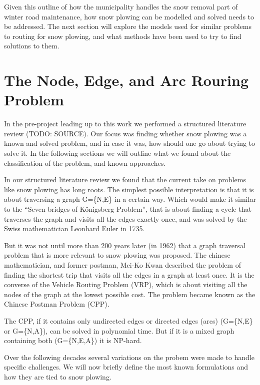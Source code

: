 
Given this outline of how the municipality handles the snow removal part of winter road maintenance, how snow plowing can be modelled and solved needs to be addressed. The next section will explore the models used for similar problems to routing for snow plowing, and what methods have been used to try to find solutions to them.


\section{The Node, Edge, and Arc Rouring Problem}
\label{the_nearp}

In the pre-project leading up to this work we performed a structured literature review (TODO: SOURCE). Our focus was finding whether snow plowing was a known and solved problem, and in case it was, how should one go about trying to solve it. In the following sections we will outline what we found about the classification of the problem, and known approaches.

In our structured literature review we found that the current take on problems like snow plowing has long roots. The simplest possible interpretation is that it is about traversing a graph G=\{N,E\} in a certain way. Which would make it similar to the “Seven bridges of Königsberg Problem”, that is about finding a cycle that traverses the graph and visits all the edges exactly once, and was solved by the Swiss mathematician Leonhard Euler in 1735.

But it was not until more than 200 years later (in 1962) that a graph traversal problem that is more relevant to snow plowing was proposed. The chinese mathematician, and former postman, Mei-Ko Kwan described the problem of finding the shortest trip that visits all the edges in a graph at least once. It is the converse of the Vehicle Routing Problem (VRP), which is about visiting all the nodes of the graph at the lowest possible cost. The problem became known as the Chinese Postman Problem (CPP).

The CPP, if it contains only undirected edges or directed edges (arcs) (G=\{N,E\} or G=\{N,A\}), can be solved in polynomial time. But if it is a mixed graph containing both (G=\{N,E,A\}) it is NP-hard.

Over the following decades several variations on the probem were made to handle specific challenges. We will now briefly define the most known formulations and how they are tied to snow plowing.

